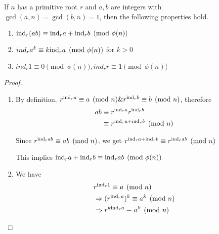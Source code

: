 \begin{theorem}
    If $n$ has a primitive root $r$ and $a, b$ are integers with $\gcd(a, n) = \gcd(b, n) = 1$,
    then the following properties hold.

    \begin{enumerate}
        \item $\text{ind}_r(ab) \equiv \text{ind}_r a + \text{ind}_r b \pmod{\phi(n)}$
        \item $ind_r a^k \equiv k \text{ind}_r a \pmod{\phi(n)}$ for $k > 0$
        \item $ind_r 1 \equiv 0 \pmod{\phi(n)}, ind_r r \equiv 1 \pmod{\phi(n)}$
    \end{enumerate}
\end{theorem}
\begin{proof}
    \begin{enumerate}
        \item By definition, $r^{\text{ind}_r a} \equiv a \pmod n \& r^{\text{ind}_r b} \equiv b \pmod n$,
        therefore
        \[
            \begin{aligned}
                ab &\equiv r^{\text{ind}_r a} r^{\text{ind}_r b} \\
                &\equiv r^{\text{ind}_r a + \text{ind}_r b} \pmod n
            \end{aligned}
        \]

        Since $r^{\text{ind}_r ab} \equiv ab \pmod n$, we get $r^{\text{ind}_r a + \text{ind}_r b} \equiv r^{\text{ind}_r ab} \pmod n$

        This implies $\text{ind}_r a + \text{ind}_r b \equiv \text{ind}_r ab \pmod{\phi(n)}$

        \item We have 
        \[
            \begin{aligned}
                &r^{\text{ind}_r 1} \equiv a \pmod n\\
                &\Rightarrow (r^{\text{ind}_r a})^k \equiv a^k \pmod n\\
                &\Rightarrow r^{k\text{ind}_r a} \equiv a^k \pmod n\\
            \end{aligned}
        \]
    \end{enumerate}
\end{proof}